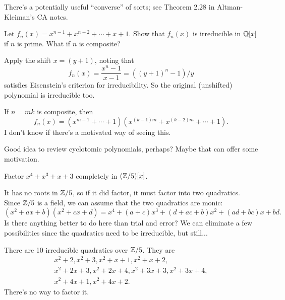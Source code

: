 \begin{rem*}
	There's a potentially useful ``converse'' of sorts; see Theorem 2.28 in Altman-Kleiman's CA notes.
\end{rem*}

\begin{problem}
	Let $f_n(x) = x^{n-1} + x^{n-2} + \cdots + x + 1$. Show that $f_n(x)$ is irreducible in $\mathbb{Q}[x]$ if $n$ is prime. What if $n$ is composite?
\end{problem}
\begin{solution}
	Apply the shift $x = (y+1)$, noting that
	\[
		f_n(x) = \frac{x^n - 1}{x - 1} = ((y+1)^n - 1)/y
	\]
	satisfies Eisenstein's criterion for irreducibility. So the original (unshifted) polynomial is irreducible too.
	
	If $n = mk$ is composite, then
	\[
		f_n(x) = (x^{m-1} + \cdots + 1)(x^{(k-1)m} + x^{(k-2) m} + \cdots + 1).
	\]
	I don't know if there's a motivated way of seeing this.
\end{solution}

\begin{rem*}
	Good idea to review cyclotomic polynomials, perhaps? Maybe that can offer some motivation.
\end{rem*}

\begin{problem}
	Factor $x^4 + x^3 + x + 3$ completely in $(\mathbb{Z}/5)[x]$.
\end{problem}
\begin{solution}
	It has no roots in $\mathbb{Z}/5$, so if it did factor, it must factor into two quadratics. Since $\mathbb{Z}/5$ is a field, we can assume that the two quadratics are monic:
	\[
		(x^2 + ax + b)(x^2 + cx + d) = x^4 + (a+c) x^3 + (d + ac + b) x^2 + (ad + bc) x + bd.
	\]
	Is there anything better to do here than trial and error? We can eliminate a few possibilities since the quadratics need to be irreducible, but still...
	
	There are 10 irreducible quadratics over $\mathbb{Z}/5$. They are
	\begin{gather*}
		x^2 + 2, x^2 + 3, x^2 + x + 1, x^2 + x + 2,\\
		x^2 + 2x + 3, x^2 + 2x + 4, x^2 + 3x + 3, x^2 + 3x + 4,\\
		x^2 + 4x + 1, x^2 + 4x + 2.
	\end{gather*}
	There's no way to factor it.
\end{solution}

